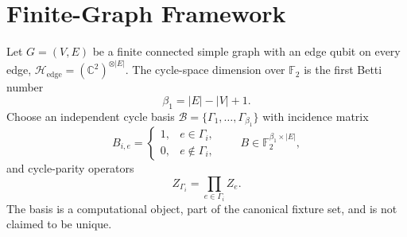 \documentclass[10pt,twocolumn]{article}
\theoremstyle{definition}
\newcommand{\F}{\mathbb{F}_2}
\newcommand{\Hedge}{\mathcal{H}_{\mathrm{edge}}}
\begin{document}
\section{Finite-Graph Framework}
Let $G=(V,E)$ be a finite connected simple graph with an edge qubit on every edge, $\Hedge=(\mathbb C^2)^{\otimes|E|}$. The cycle-space dimension over $\F$ is the first Betti number
\begin{equation}
\beta_1=|E|-|V|+1. \label{eq:beta}
\end{equation}
Choose an independent cycle basis $\mathcal B=\{\Gamma_1,\ldots,\Gamma_{\beta_1}\}$ with incidence matrix
\begin{equation}
B_{i,e}=\begin{cases}1,&e\in\Gamma_i,\\0,&e\notin\Gamma_i,\end{cases}\qquad B\in\F^{\beta_1\times|E|}, \label{eq:B}
\end{equation}
and cycle-parity operators
\begin{equation}
Z_{\Gamma_i}=\prod_{e\in\Gamma_i}Z_e. \label{eq:ZC}
\end{equation}
The basis is a computational object, part of the canonical fixture set, and is not claimed to be unique.

\end{document}
